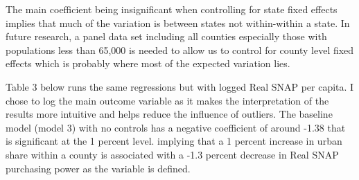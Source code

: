 \documentclass{article}
\begin{document}
The main coefficient being insignificant when controlling for state fixed effects implies that much of the variation is between states not within-within a state. In future research, a panel data set including all counties especially those with populations less than 65,000 is needed to allow us to control for county level fixed effects which is probably where most of the expected variation lies.

Table 3 below runs the same regressions but with logged Real SNAP per capita. I chose to log the main outcome variable as it makes the interpretation of the results more intuitive and helps reduce the influence of outliers. The baseline model (model 3) with no controls has a negative coefficient of around -1.38 that is significant at the 1 percent level. implying that a 1 percent increase in urban share within a county is associated with a -1.3 percent decrease in Real SNAP purchasing power as the variable is defined.
\end{document}
